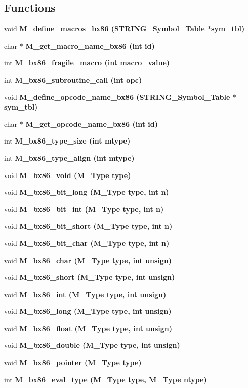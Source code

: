 \subsection*{Functions}
\begin{CompactItemize}
\item 
void \bf{M\_\-define\_\-macros\_\-bx86} (\bf{STRING\_\-Symbol\_\-Table} $\ast$sym\_\-tbl)
\item 
char $\ast$ \bf{M\_\-get\_\-macro\_\-name\_\-bx86} (int id)
\item 
int \bf{M\_\-bx86\_\-fragile\_\-macro} (int macro\_\-value)
\item 
int \bf{M\_\-bx86\_\-subroutine\_\-call} (int opc)
\item 
void \bf{M\_\-define\_\-opcode\_\-name\_\-bx86} (\bf{STRING\_\-Symbol\_\-Table} $\ast$sym\_\-tbl)
\item 
char $\ast$ \bf{M\_\-get\_\-opcode\_\-name\_\-bx86} (int id)
\item 
int \bf{M\_\-bx86\_\-type\_\-size} (int mtype)
\item 
int \bf{M\_\-bx86\_\-type\_\-align} (int mtype)
\item 
void \bf{M\_\-bx86\_\-void} (\bf{M\_\-Type} type)
\item 
void \bf{M\_\-bx86\_\-bit\_\-long} (\bf{M\_\-Type} type, int n)
\item 
void \bf{M\_\-bx86\_\-bit\_\-int} (\bf{M\_\-Type} type, int n)
\item 
void \bf{M\_\-bx86\_\-bit\_\-short} (\bf{M\_\-Type} type, int n)
\item 
void \bf{M\_\-bx86\_\-bit\_\-char} (\bf{M\_\-Type} type, int n)
\item 
void \bf{M\_\-bx86\_\-char} (\bf{M\_\-Type} type, int unsign)
\item 
void \bf{M\_\-bx86\_\-short} (\bf{M\_\-Type} type, int unsign)
\item 
void \bf{M\_\-bx86\_\-int} (\bf{M\_\-Type} type, int unsign)
\item 
void \bf{M\_\-bx86\_\-long} (\bf{M\_\-Type} type, int unsign)
\item 
void \bf{M\_\-bx86\_\-float} (\bf{M\_\-Type} type, int unsign)
\item 
void \bf{M\_\-bx86\_\-double} (\bf{M\_\-Type} type, int unsign)
\item 
void \bf{M\_\-bx86\_\-pointer} (\bf{M\_\-Type} type)
\item 
int \bf{M\_\-bx86\_\-eval\_\-type} (\bf{M\_\-Type} type, \bf{M\_\-Type} ntype)
\item 

\end{CompactItemize}

